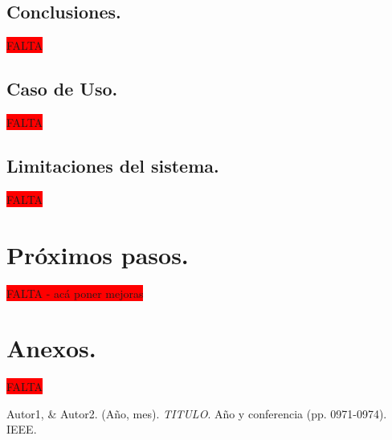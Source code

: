 \documentclass[12pt,a4paper]{article}
\begin{document}
\cleardoublepage

\subsection{Conclusiones.}
\colorbox{red}{FALTA}

\cleardoublepage

\subsection{Caso de Uso.}
\colorbox{red}{FALTA}

\cleardoublepage

\subsection{Limitaciones del sistema.}
\colorbox{red}{FALTA}

\cleardoublepage

\section{Próximos pasos.}  
\colorbox{red}{FALTA - acá poner mejoras}

\cleardoublepage

\section{Anexos.}
\colorbox{red}{FALTA}

\cleardoublepage


\begin{thebibliography}{9}
Autor1, \& Autor2. (Año, mes). \textit{TITULO}. Año y conferencia (pp. 0971-0974). IEEE.

\end{thebibliography}
\end{document}
